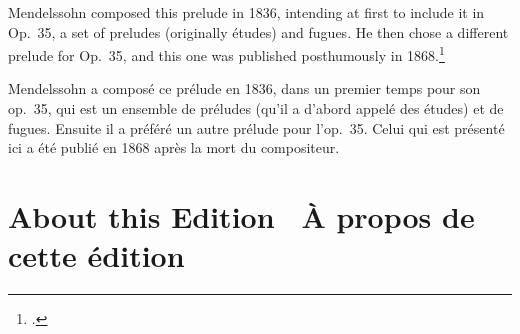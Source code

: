 \documentclass[a4paper, 12pt]{book}
\newcommand{\bigdot}[0]{{\Large \textbullet}}
\newcommand{\centerbigdot}[0]{\begin{center}\bigdot\end{center}}
\begin{document}
Mendelssohn composed this prelude in 1836, intending at first to
include it in Op.\ 35, a set of preludes (originally études) and
fugues. He then chose a different prelude for Op.\ 35, and this one
was published posthumously in 1868.\footnote{\cite[188--198]{todd_2008}\label{todd}.}

\centerbigdot

\begin{otherlanguage}{french}
Mendelssohn a composé ce prélude en 1836, dans un premier temps pour
son op.\ 35, qui est un ensemble de préludes (qu'il a d'abord appelé
des études) et de fugues. Ensuite il a préféré un autre prélude pour
l'op.\ 35. Celui qui est présenté ici a été publié en 1868 après la
mort du compositeur.
\end{otherlanguage}

\section*{About this Edition \bigdot\ \foreignlanguage{french}{À propos de cette édition}}
\end{document}
